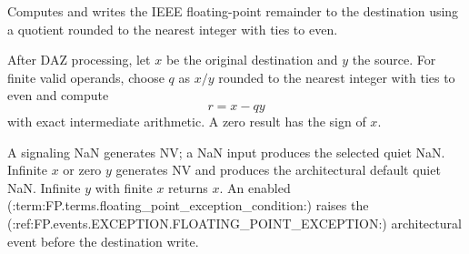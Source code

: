 Computes and writes the IEEE floating-point remainder to the destination using a quotient rounded to the nearest integer with ties to even.

After DAZ processing, let \(x\) be the original destination and \(y\) the source. For finite valid operands, choose \(q\) as \(x/y\) rounded to the nearest integer with ties to even and compute
\[
  r = x - qy
\]
with exact intermediate arithmetic. A zero result has the sign of \(x\).

A signaling NaN generates NV; a NaN input produces the selected quiet NaN. Infinite \(x\) or zero \(y\) generates NV and produces the architectural default quiet NaN. Infinite \(y\) with finite \(x\) returns \(x\). An enabled (:term:FP.terms.floating_point_exception_condition:) raises the (:ref:FP.events.EXCEPTION.FLOATING_POINT_EXCEPTION:) architectural event before the destination write.
